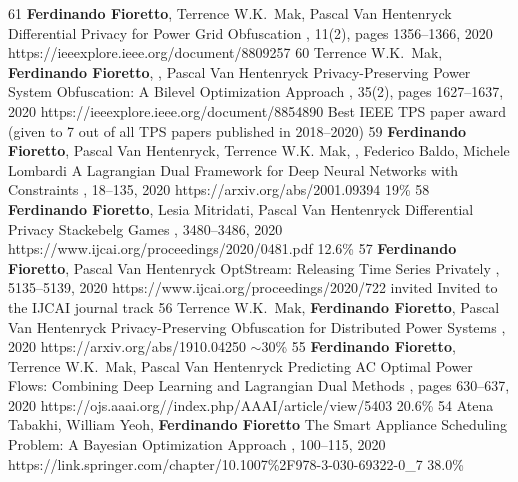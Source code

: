\begin{pubs}
\journalentry
	{61} %
		{{\bf Ferdinando Fioretto}, Terrence W.K.~Mak, Pascal Van Hentenryck}
		{Differential Privacy for Power Grid Obfuscation}
		{\TSG, 11(2), pages 1356--1366, 2020}
		{https://ieeexplore.ieee.org/document/8809257}
\journalentryAwd
	{60}	%
		{Terrence W.K.~Mak, {\bf Ferdinando Fioretto}, , Pascal Van Hentenryck}
		{Privacy-Preserving Power System Obfuscation: A Bilevel Optimization Approach}
		{\TPS, 35(2), pages 1627--1637, 2020}
		{https://ieeexplore.ieee.org/document/8854890}
		{Best IEEE TPS paper award}
		{(given to 7 out of all TPS papers published in 2018--2020)}
\confentry
		{59} %
		{{\bf Ferdinando Fioretto}, Pascal Van Hentenryck, Terrence W.K. Mak, , Federico Baldo, Michele Lombardi} 
		{A Lagrangian Dual Framework for Deep Neural Networks with Constraints}
		{\procECML, 18--135, 2020}
		{https://arxiv.org/abs/2001.09394}
		{19\%}
\confentry
		{58} %
		{{\bf Ferdinando Fioretto}, Lesia Mitridati, Pascal Van Hentenryck}
		{Differential Privacy Stackebelg Games}
		{\procIJCAI, 3480--3486, 2020}
		{https://www.ijcai.org/proceedings/2020/0481.pdf}
	    {12.6\%}
\confentryAwd
		{57} %
		{{\bf Ferdinando Fioretto}, Pascal Van Hentenryck}
		{OptStream: Releasing Time Series Privately}
		{\procIJCAI, 5135--5139, 2020}
	    {https://www.ijcai.org/proceedings/2020/722}
		{invited}
		{Invited to the IJCAI journal track}{}	
\confentry
		{56} %
		{Terrence W.K.~Mak, {\bf Ferdinando Fioretto}, Pascal Van Hentenryck}
		{Privacy-Preserving Obfuscation for Distributed Power Systems}
		{\procPSCC, 2020}
		{https://arxiv.org/abs/1910.04250}
	    {$\sim$30\%} %
\confentry
		{55} %
		{{\bf Ferdinando Fioretto}, Terrence W.K.~Mak, Pascal Van Hentenryck}
		{Predicting AC Optimal Power Flows: Combining Deep Learning and Lagrangian Dual Methods}
	  	{\procAAAI, pages 630--637, 2020}
	  	{https://ojs.aaai.org//index.php/AAAI/article/view/5403}
	    {20.6\%} %
\confentry
	{54} %
    {Atena Tabakhi, William Yeoh, {\bf Ferdinando Fioretto}}
    {The Smart Appliance Scheduling Problem: A Bayesian Optimization Approach}
    {\procPRIMA, 100--115, 2020}
    {https://link.springer.com/chapter/10.1007\%2F978-3-030-69322-0\_7}
    {38.0\%} %


\end{pubs}
